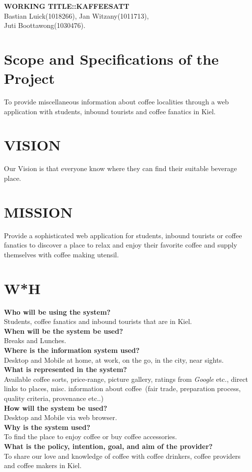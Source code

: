 \documentclass{article}
\begin{document}
\thispagestyle{empty}
\vspace*{-3.5cm}
\begin{center}
\Large{\textbf{WORKING TITLE::KAFFEESATT}}\\
Bastian Luick(1018266), Jan Witzany(1011713),\\ Juti Boottawong(1030476).
\end{center}
\vspace*{-0.5cm}
\section*{Scope and Specifications of the Project}
To provide miscellaneous information about coffee localities through a web application with students, inbound tourists and coffee fanatics in Kiel.
\vspace*{-0.5cm}
\section*{VISION}
Our Vision is that everyone know where they can find their suitable beverage place.
\vspace*{-0.5cm}
\section*{MISSION}
Provide a sophisticated web application for students, inbound tourists or coffee fanatics to discover a place to relax and enjoy their favorite coffee and supply themselves with coffee making utensil.
\vspace*{-0.5cm}
\section*{W*H}
\textbf{Who will be using the system?}\\
Students, coffee fanatics and inbound tourists that are in Kiel.\\
\textbf{When will be the system be used?}\\
Breaks and Lunches.\\
\textbf{Where is the information system used?}\\
Desktop and Mobile at home, at work, on the go, in the city, near sights.\\
\textbf{What is represented in the system?}\\
Available coffee sorts, price-range, picture gallery, ratings from \textit{Google} etc., direct links to places, misc. information about coffee~(fair trade, preparation process, quality criteria, provenance etc..)\\
\textbf{How will the system be used?}\\
Desktop and Mobile via web browser.\\
\textbf{Why is the system used?}\\
To find the place to enjoy coffee or buy coffee accessories.\\
\textbf{What is the policy, intention, goal, and aim of the provider?}\\
To share our love and knowledge of coffee with coffee drinkers, coffee providers and coffee makers in Kiel.
\vspace*{-0.5cm}
\end{document}
